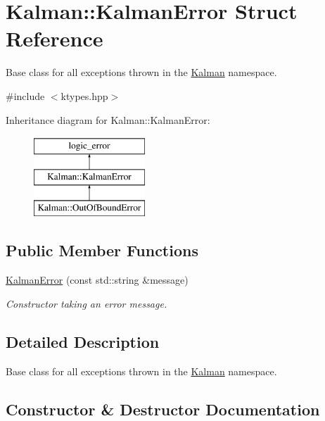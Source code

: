 \hypertarget{structKalman_1_1KalmanError}{}\section{Kalman\+:\+:Kalman\+Error Struct Reference}
\label{structKalman_1_1KalmanError}


Base class for all exceptions thrown in the {\ttfamily \mbox{\hyperlink{namespaceKalman}{Kalman}}} namespace.  




{\ttfamily \#include $<$ktypes.\+hpp$>$}

Inheritance diagram for Kalman\+:\+:Kalman\+Error\+:\begin{figure}[H]
\begin{center}
\leavevmode
\includegraphics[height=3.000000cm]{structKalman_1_1KalmanError}
\end{center}
\end{figure}
\subsection*{Public Member Functions}
\begin{DoxyCompactItemize}
\item 
\mbox{\hyperlink{structKalman_1_1KalmanError_aa9adcfb76edbc5f387c2f4688c3275a1}{Kalman\+Error}} (const std\+::string \&message)
\begin{DoxyCompactList}\small\item\em Constructor taking an error message. \end{DoxyCompactList}\end{DoxyCompactItemize}


\subsection{Detailed Description}
Base class for all exceptions thrown in the {\ttfamily \mbox{\hyperlink{namespaceKalman}{Kalman}}} namespace. 

\subsection{Constructor \& Destructor Documentation}
\mbox{\label{structKalman_1_1KalmanError_aa9adcfb76edbc5f387c2f4688c3275a1}} 
